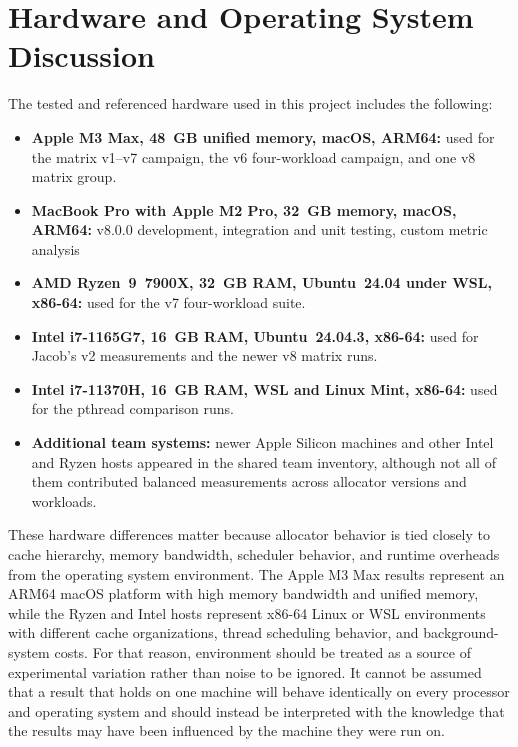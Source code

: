 \section{Hardware and Operating System Discussion}
\label{sec:hardware-os-discussion}

The tested and referenced hardware used in this project includes the following:

\begin{itemize}
\item \textbf{Apple M3 Max, 48~GB unified memory, macOS, ARM64:} used for the
matrix v1--v7 campaign, the v6 four-workload campaign, and one v8 matrix group.
\item \textbf{MacBook Pro with Apple M2 Pro, 32~GB memory, macOS, ARM64:}
v8.0.0 development, integration and unit testing, custom metric analysis
\item \textbf{AMD Ryzen~9~7900X, 32~GB RAM, Ubuntu~24.04 under WSL, x86-64:}
used for the v7 four-workload suite.
\item \textbf{Intel i7-1165G7, 16~GB RAM, Ubuntu~24.04.3, x86-64:} used for
Jacob's v2 measurements and the newer v8 matrix runs.
\item \textbf{Intel i7-11370H, 16~GB RAM, WSL and Linux Mint, x86-64:} used for
the pthread comparison runs.
\item \textbf{Additional team systems:} newer Apple Silicon machines and other
Intel and Ryzen hosts appeared in the shared team inventory, although not all
of them contributed balanced measurements across allocator versions and
workloads.
\end{itemize}

These hardware differences matter because allocator behavior is tied closely to cache hierarchy, memory bandwidth,
scheduler behavior, and runtime overheads from the operating system environment. The Apple M3 Max results
represent an ARM64 macOS platform with high memory bandwidth and unified memory, while the Ryzen and
Intel hosts represent x86-64 Linux or WSL environments with different cache organizations, thread scheduling
behavior, and background-system costs. For that reason, environment should be treated as a source of
experimental variation rather than noise to be ignored. It cannot be assumed that a result that holds on one
machine will behave identically on every processor and operating system and should instead be interpreted with
the knowledge that the results may have been influenced by the machine they were run on.
